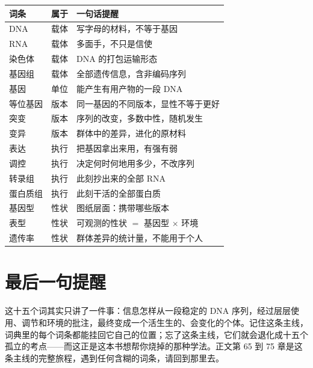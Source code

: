 \begin{table}[htbp]
\centering
\begin{tabular}{llp{6.2cm}}
\toprule
\textbf{词条} & \textbf{属于} & \textbf{一句话提醒} \\
\midrule
DNA & 载体 & 写字母的材料，不等于基因 \\
RNA & 载体 & 多面手，不只是信使 \\
染色体 & 载体 & DNA 的打包运输形态 \\
基因组 & 载体 & 全部遗传信息，含非编码序列 \\
基因 & 单位 & 能产生有用产物的一段 DNA \\
等位基因 & 版本 & 同一基因的不同版本，显性不等于更好 \\
突变 & 版本 & 序列的改变，多数中性，随机发生 \\
变异 & 版本 & 群体中的差异，进化的原材料 \\
表达 & 执行 & 把基因拿出来用，有强有弱 \\
调控 & 执行 & 决定何时何地用多少，不改序列 \\
转录组 & 执行 & 此刻抄出来的全部 RNA \\
蛋白质组 & 执行 & 此刻干活的全部蛋白质 \\
基因型 & 性状 & 图纸层面：携带哪些版本 \\
表型 & 性状 & 可观测的性状 $=$ 基因型 $\times$ 环境 \\
遗传率 & 性状 & 群体差异的统计量，不能用于个人 \\
\bottomrule
\end{tabular}
\end{table}

\section*{最后一句提醒}

这十五个词其实只讲了一件事：信息怎样从一段稳定的 DNA 序列，经过层层使用、调节和环境的批注，最终变成一个活生生的、会变化的个体。记住这条主线，词典里的每个词条都能挂回它自己的位置；忘了这条主线，它们就会退化成十五个孤立的考点——而这正是这本书想帮你烧掉的那种学法。正文第 65 到 75 章是这条主线的完整旅程，遇到任何含糊的词条，请回到那里去。

